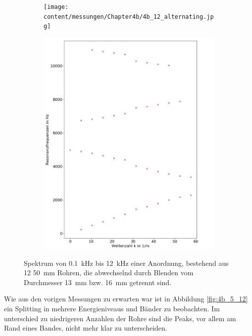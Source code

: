\begin{figure}
\centering
\begin{subfigure}{0.65\textwidth}
\texttt{[image: content/messungen/Chapter4b/4b\_12\_alternating.jpg]}
\end{subfigure}
\begin{subfigure}{0.34\textwidth}
\includegraphics[width=\textwidth]{content/Scripts/4b_5_alt_red.jpg}
\end{subfigure}
\caption{Spektrum von 0.1~kHz bis 12~kHz einer Anordnung, bestehend aus 12 50~mm Rohren, die abwechselnd durch Blenden vom Durchmesser 13~mm bzw. 16~mm getrennt sind.}
\label{fig:4b_5_12_alternating}
\end{figure}
Wie aus den vorigen Messungen zu erwarten war ist in Abbildung \ref{fig:4b_5_12} ein Splitting in mehrere Energieniveaus und Bänder zu beobachten. 
Im unterschied zu niedrigeren Anzahlen der Rohre sind die Peaks, vor allem am Rand eines Bandes, nicht mehr klar zu unterscheiden.
